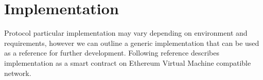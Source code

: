 \documentclass{article}
\begin{document}
\begin{CJK}{UTF8}{gbsn}
\begin{multicols}{2}
            \paragraph{}






            \section{Implementation}
            Protocol particular implementation may vary depending on environment and requirements, however we can outline a generic implementation that can be used as a reference for further development. Following reference describes implementation as a smart contract on Ethereum Virtual Machine compatible network. \\




\end{multicols}
\end{CJK}
\end{document}
